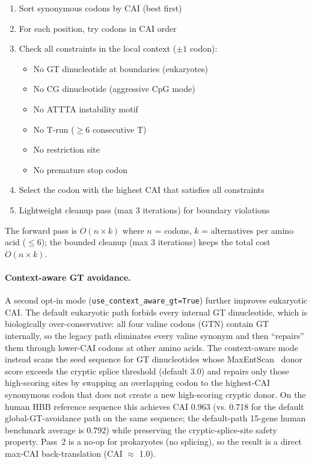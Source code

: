 \documentclass[11pt,a4paper]{article}
\theoremstyle{definition}
\begin{document}
\begin{enumerate}[leftmargin=*,itemsep=1pt]
\item Sort synonymous codons by CAI (best first)
\item For each position, try codons in CAI order
\item Check all constraints in the local context ($\pm 1$ codon):
  \begin{itemize}[itemsep=0pt]
  \item No GT dinucleotide at boundaries (eukaryotes)
  \item No CG dinucleotide (aggressive CpG mode)
  \item No ATTTA instability motif
  \item No T-run ($\geq 6$ consecutive T)
  \item No restriction site
  \item No premature stop codon
  \end{itemize}
\item Select the codon with the highest CAI that satisfies all constraints
\item Lightweight cleanup pass (max 3 iterations) for boundary violations
\end{enumerate}

The forward pass is $O(n \times k)$ where $n$ = codons, $k$ = alternatives per amino acid ($\leq 6$); the bounded cleanup (max 3 iterations) keeps the total cost $O(n \times k)$.

\paragraph{Context-aware GT avoidance.} A second opt-in mode (\texttt{use\_context\_aware\_gt=True}) further improves eukaryotic CAI. The default eukaryotic path forbids every internal GT dinucleotide, which is biologically over-conservative: all four valine codons (GTN) contain GT internally, so the legacy path eliminates every valine synonym and then ``repairs'' them through lower-CAI codons at other amino acids. The context-aware mode instead scans the seed sequence for GT dinucleotides whose MaxEntScan~\cite{yeo2004maxentscan} donor score exceeds the cryptic splice threshold (default 3.0) and repairs only those high-scoring sites by swapping an overlapping codon to the highest-CAI synonymous codon that does not create a new high-scoring cryptic donor. On the human HBB reference sequence this achieves CAI 0.963 (vs. 0.718 for the default global-GT-avoidance path on the same sequence; the default-path 15-gene human benchmark average is 0.792) while preserving the cryptic-splice-site safety property. Pass~2 is a no-op for prokaryotes (no splicing), so the result is a direct max-CAI back-translation (CAI $\approx$ 1.0).
\end{document}
